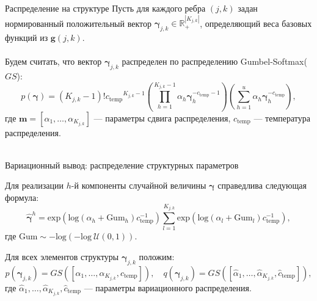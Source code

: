 \documentclass[usenames,dvipsnames,11pt,pdf,utf8,russian,aspectratio=169]{beamer}
\begin{document}
\iffalse
\begin{frame}{ Распределение на структуре}
Пусть для каждого ребра $(j,k)$ задан нормированный положительный вектор $\boldsymbol{\gamma}_{j,k} \in \mathbb{R}_{+}^{|K_{j,k}|}$, определяющий веса базовых функций из  $\mathbf{g}(j,k)$.
\\~\\
Будем считать, что вектор $\boldsymbol{\gamma}_{j,k}$ распределен по распределению Gumbel-Softmax($GS$):
\[
    p(\boldsymbol{\gamma}) = (K_{j,k}-1)!{c_{\text{temp}}}^{K_{j,k}-1}\left(\prod_{h=1}^{K_{j,k}-1} \alpha_h \boldsymbol{\gamma}_h^{-c_{\text{temp}}-1}\right)\left(\sum_{h=1}^u\alpha_h\boldsymbol{\gamma}_h^{-c_{\text{temp}}}\right),
\] 
где $\mathbf{m} = [\alpha_1,\dots,\alpha_{K_{j,k}}]$ --- параметры сдвига распределения, $c_{\text{temp}}$ --- температура распределения. 
\\~\\

\end{frame}




\begin{frame}{Вариационный вывод: распределение структурных параметров}

Для реализации $h$-й компоненты случайной величины $\boldsymbol{\gamma}$ справедлива следующая формула:
\[
    \hat{\boldsymbol{\gamma}}^h = \text{exp}\left(\text{log}\left(\alpha_h + \text{Gum}_h\right)c_{\text{temp}}^{-1}\right) \sum_{l=1}^{K_{j,k}} \text{exp}\left(\text{log}\left(\alpha_l + \text{Gum}_l\right)c_{\text{temp}}^{-1}\right),
\]
где $\text{Gum} \sim -\text{log}(-\text{log}~\mathcal{U}(0,1)).$ 

Для всех элементов структуры $\boldsymbol{\gamma}_{j,k}$ положим:
\[
    p(\boldsymbol{\gamma}_{j,k}) = GS([\alpha_1, \dots, \alpha_{K_{j,k}}, c_{\text{temp}}]), \quad q(\boldsymbol{\gamma}_{j,k}) = GS([\hat{\alpha}_1, \dots, \hat{\alpha}_{K_{j,k}}, \hat{c}_{\text{temp}}]),
\]
где $\hat{\alpha}_1, \dots, \hat{\alpha}_{K_{j,k}}, \hat{c}_{\text{temp}}$ --- параметры вариационного распределения.
\end{frame}




    
\end{document}
